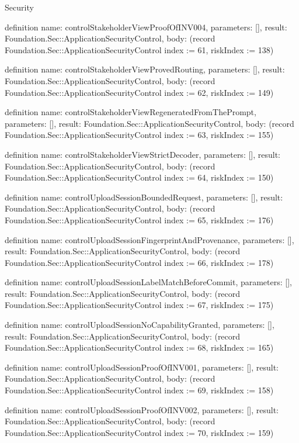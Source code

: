 \begin{lexlean}{Security}
\begin{semanticmodule}
definition{
  name: controlStakeholderViewProofOfINV004,
  parameters: [],
  result: Foundation.Sec::ApplicationSecurityControl,
  body: (record Foundation.Sec::ApplicationSecurityControl {index := 61, riskIndex := 138})
}

definition{
  name: controlStakeholderViewProvedRouting,
  parameters: [],
  result: Foundation.Sec::ApplicationSecurityControl,
  body: (record Foundation.Sec::ApplicationSecurityControl {index := 62, riskIndex := 149})
}

definition{
  name: controlStakeholderViewRegeneratedFromThePrompt,
  parameters: [],
  result: Foundation.Sec::ApplicationSecurityControl,
  body: (record Foundation.Sec::ApplicationSecurityControl {index := 63, riskIndex := 155})
}

definition{
  name: controlStakeholderViewStrictDecoder,
  parameters: [],
  result: Foundation.Sec::ApplicationSecurityControl,
  body: (record Foundation.Sec::ApplicationSecurityControl {index := 64, riskIndex := 150})
}

definition{
  name: controlUploadSessionBoundedRequest,
  parameters: [],
  result: Foundation.Sec::ApplicationSecurityControl,
  body: (record Foundation.Sec::ApplicationSecurityControl {index := 65, riskIndex := 176})
}

definition{
  name: controlUploadSessionFingerprintAndProvenance,
  parameters: [],
  result: Foundation.Sec::ApplicationSecurityControl,
  body: (record Foundation.Sec::ApplicationSecurityControl {index := 66, riskIndex := 178})
}

definition{
  name: controlUploadSessionLabelMatchBeforeCommit,
  parameters: [],
  result: Foundation.Sec::ApplicationSecurityControl,
  body: (record Foundation.Sec::ApplicationSecurityControl {index := 67, riskIndex := 175})
}

definition{
  name: controlUploadSessionNoCapabilityGranted,
  parameters: [],
  result: Foundation.Sec::ApplicationSecurityControl,
  body: (record Foundation.Sec::ApplicationSecurityControl {index := 68, riskIndex := 165})
}

definition{
  name: controlUploadSessionProofOfINV001,
  parameters: [],
  result: Foundation.Sec::ApplicationSecurityControl,
  body: (record Foundation.Sec::ApplicationSecurityControl {index := 69, riskIndex := 158})
}

definition{
  name: controlUploadSessionProofOfINV002,
  parameters: [],
  result: Foundation.Sec::ApplicationSecurityControl,
  body: (record Foundation.Sec::ApplicationSecurityControl {index := 70, riskIndex := 159})
}


\end{semanticmodule}
\end{lexlean}
